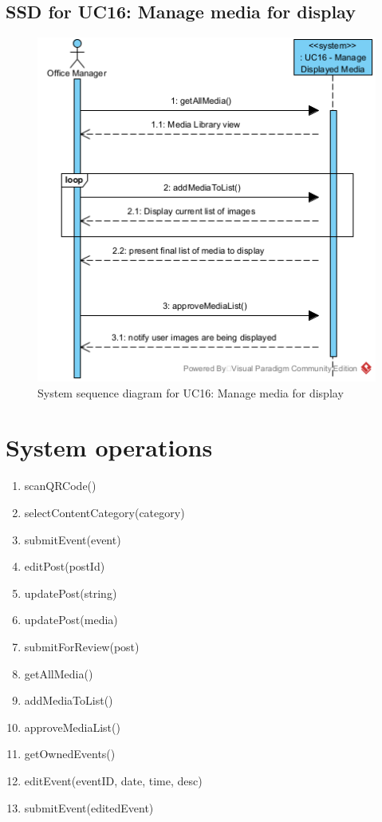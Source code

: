 \documentclass{article}
\begin{document}
\subsection{SSD for UC16: Manage media for display}
\begin{figure}[H]
    \centering
    \includegraphics[scale=1.0]{images/SSD - UC16 - Manage Displayed Media.png}
    \caption{System sequence diagram for UC16: Manage media for display}
    \label{fig:enter-label}
\end{figure}
\section{System operations}
\begin{enumerate}
    \item scanQRCode()
    \item selectContentCategory(category)
    \item submitEvent(event)
    \item editPost(postId)
    \item updatePost(string)
    \item updatePost(media)
    \item submitForReview(post)
    \item getAllMedia()
    \item addMediaToList()
    \item approveMediaList()
    \item getOwnedEvents()
    \item editEvent(eventID, date, time, desc)
    \item submitEvent(editedEvent)
\end{enumerate}
\end{document}
